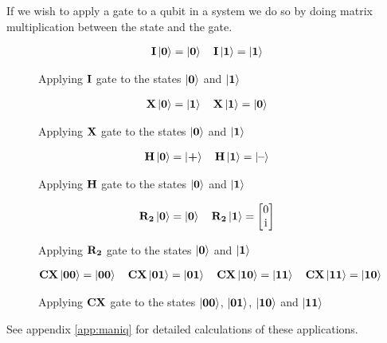 \noindent
If we wish to apply a gate to a qubit in a system we do so by doing matrix multiplication between the state and the gate. 
\begin{figure}[H]
    \centering
    \begin{align*}
        \mathbf{I}\ket{\mathbf{0}}=\ket{\mathbf{0}}\quad
        \mathbf{I}\ket{\mathbf{1}}=\ket{\mathbf{1}}
    \end{align*}
    \caption{Applying $\mathbf{I}$ gate to the states $\ket{\mathbf{0}}$ and $\ket{\mathbf{1}}$}
    \label{fig:i}
\end{figure}

\begin{figure}[H]
    \centering
    \begin{align*}
        \mathbf{X}\ket{\mathbf{0}}=\ket{\mathbf{1}}\quad
        \mathbf{X}\ket{\mathbf{1}}=\ket{\mathbf{0}}
    \end{align*}
    \caption{Applying $\mathbf{X}$ gate to the states $\ket{\mathbf{0}}$ and $\ket{\mathbf{1}}$}
    \label{fig:x}
\end{figure}

\begin{figure}[H]
    \centering
    \begin{align*}
        \mathbf{H}\ket{\mathbf{0}}=\ket{\textbf{+}}\quad
        \mathbf{H}\ket{\mathbf{1}}=\ket{\textbf{--}}
    \end{align*}
    \caption{Applying $\mathbf{H}$ gate to the states $\ket{\mathbf{0}}$ and $\ket{\mathbf{1}}$}
    \label{fig:h}
\end{figure}

\begin{figure}[H]
    \centering
    \begin{align*}
        \mathbf{R_{2}}\ket{\mathbf{0}}=\ket{\mathbf{0}}\quad
        \mathbf{R_{2}}\ket{\mathbf{1}}=
        \begin{bmatrix}
            0\\
            \mathrm{i}\\
        \end{bmatrix}
    \end{align*}
    \caption{Applying $\mathbf{R_{2}}$ gate to the states $\ket{\mathbf{0}}$ and $\ket{\mathbf{1}}$}
    \label{fig:r2}
\end{figure}

\begin{figure}[H]
    \centering
    \begin{align*}
        \mathbf{CX}\ket{\mathbf{0}\mathbf{0}}=\ket{\mathbf{0}\mathbf{0}}\quad
        \mathbf{CX}\ket{\mathbf{0}\mathbf{1}}=\ket{\mathbf{0}\mathbf{1}}\quad
        \mathbf{CX}\ket{\mathbf{1}\mathbf{0}}=\ket{\mathbf{1}\mathbf{1}}\quad
        \mathbf{CX}\ket{\mathbf{1}\mathbf{1}}=\ket{\mathbf{1}\mathbf{0}}
    \end{align*}
    \caption{Applying $\mathbf{CX}$ gate to the states $\ket{\mathbf{0}\mathbf{0}}$, $\ket{\mathbf{0}\mathbf{1}}$, $\ket{\mathbf{1}\mathbf{0}}$ and $\ket{\mathbf{1}\mathbf{1}}$}
    \label{fig:cx}
\end{figure}
\noindent
See appendix \ref{app:maniq} for detailed calculations of these applications. 

